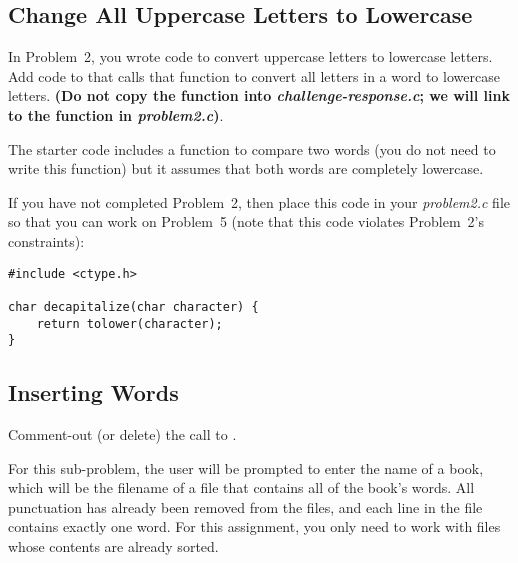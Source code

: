 \subsection{Change All Uppercase Letters to Lowercase}

In Problem~2, you wrote code to convert uppercase letters to lowercase letters.
Add code to  that calls that function to convert all letters in a word to lowercase letters.
\textbf{(Do not copy the  function into \textit{challenge-response.c};
we will link to the function in \textit{problem2.c})}.



The starter code includes a function to compare two words (you do not need to write this function) but it assumes that both words are completely lowercase.

If you have not completed Problem~2, then place this code in your \textit{problem2.c} file so that you can work on Problem~5
(note that this code violates Problem~2's constraints):

\begin{lstlisting}
#include <ctype.h>

char decapitalize(char character) {
    return tolower(character);
}
\end{lstlisting}

\subsection{Inserting Words} \label{subsec:inserting-words}

Comment-out (or delete) the call to .

For this sub-problem, the user will be prompted to enter the name of a book, which will be the filename of a file that contains all of the book's words.
All punctuation has already been removed from the files, and each line in the file contains exactly one word.
For this assignment, you only need to work with files whose contents are already sorted.



